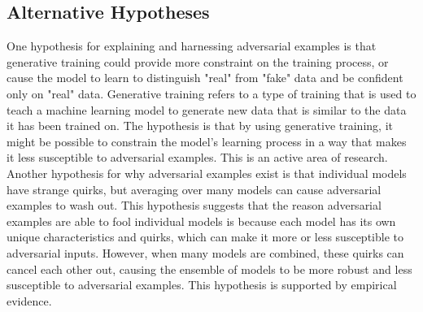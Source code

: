 \subsection{Alternative Hypotheses}
One hypothesis for explaining and harnessing adversarial examples is that generative training could provide more constraint on the training process, or cause the model to learn to distinguish "real" from "fake" data and be confident only on "real" data. Generative training refers to a type of training that is used to teach a machine learning model to generate new data that is similar to the data it has been trained on. The hypothesis is that by using generative training, it might be possible to constrain the model's learning process in a way that makes it less susceptible to adversarial examples. This is an active area of research.
Another hypothesis for why adversarial examples exist is that individual models have strange quirks, but averaging over many models can cause adversarial examples to wash out. This hypothesis suggests that the reason adversarial examples are able to fool individual models is because each model has its own unique characteristics and quirks, which can make it more or less susceptible to adversarial inputs. However, when many models are combined, these quirks can cancel each other out, causing the ensemble of models to be more robust and less susceptible to adversarial examples. This hypothesis is supported by empirical evidence.


